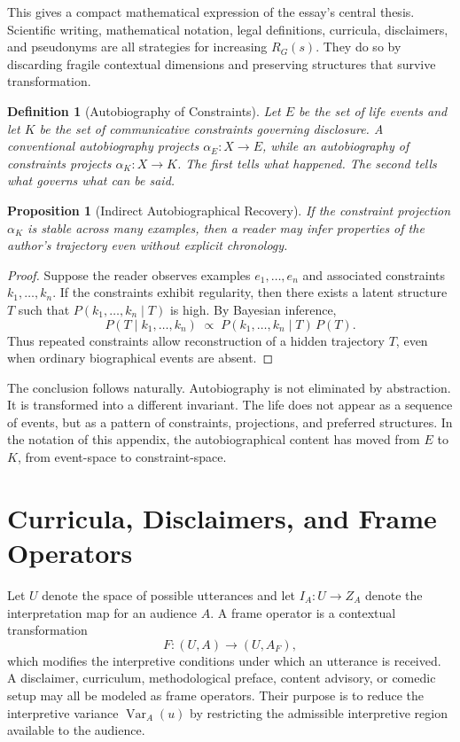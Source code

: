 \documentclass[11pt]{article}
\theoremstyle{plain}
\newtheorem{definition}{Definition}[section]
\newtheorem{proposition}{Proposition}[section]
\begin{document}
This gives a compact mathematical expression of the essay's central thesis. Scientific writing, mathematical notation, legal definitions, curricula, disclaimers, and pseudonyms are all strategies for increasing $R_G(s)$. They do so by discarding fragile contextual dimensions and preserving structures that survive transformation.

\begin{definition}[Autobiography of Constraints]
Let $E$ be the set of life events and let $K$ be the set of communicative constraints governing disclosure. A conventional autobiography projects $\alpha_E : X \to E$, while an autobiography of constraints projects $\alpha_K : X \to K$. The first tells what happened. The second tells what governs what can be said.
\end{definition}

\begin{proposition}[Indirect Autobiographical Recovery]
If the constraint projection $\alpha_K$ is stable across many examples, then a reader may infer properties of the author's trajectory even without explicit chronology.
\end{proposition}
\begin{proof}
Suppose the reader observes examples $e_1,\ldots,e_n$ and associated constraints $k_1,\ldots,k_n$. If the constraints exhibit regularity, then there exists a latent structure $T$ such that $P(k_1,\ldots,k_n \mid T)$ is high. By Bayesian inference,
\[
P(T \mid k_1,\ldots,k_n) \;\propto\; P(k_1,\ldots,k_n \mid T)\,P(T).
\]
Thus repeated constraints allow reconstruction of a hidden trajectory $T$, even when ordinary biographical events are absent.
\end{proof}

The conclusion follows naturally. Autobiography is not eliminated by abstraction. It is transformed into a different invariant. The life does not appear as a sequence of events, but as a pattern of constraints, projections, and preferred structures. In the notation of this appendix, the autobiographical content has moved from $E$ to $K$, from event-space to constraint-space.

\section{Curricula, Disclaimers, and Frame Operators}

Let $U$ denote the space of possible utterances and let $I_A : U \to Z_A$ denote the interpretation map for an audience $A$. A frame operator is a contextual transformation
\[
F : (U,A) \to (U, A_F),
\]
which modifies the interpretive conditions under which an utterance is received. A disclaimer, curriculum, methodological preface, content advisory, or comedic setup may all be modeled as frame operators. Their purpose is to reduce the interpretive variance $\operatorname{Var}_A(u)$ by restricting the admissible interpretive region available to the audience.
\end{document}
